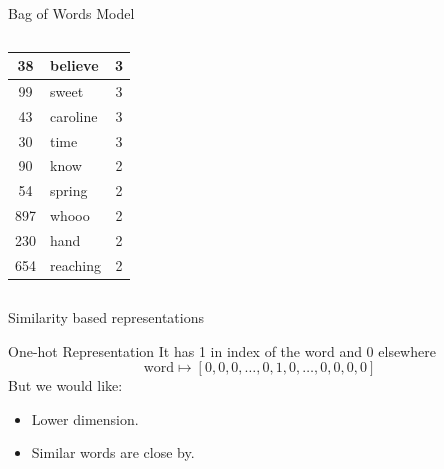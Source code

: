 \documentclass[9pt]{beamer}
\begin{document}
\begin{frame}{Bag of Words Model}
\begin{columns}[T]
\begin{column}{0.4\textwidth}
\begin{tabular}{|c|l|c|}
                \hline
                38 & believe&3\\
                \hline
                99 & sweet&3\\
                \hline
                43 & caroline&3\\
                \hline
                30 & time&3\\
                \hline
                90 &know&2\\
                \hline
                54& spring&2\\
                \hline
                897& whooo&2\\
                \hline
                230 & hand&2\\
                \hline
                654 & reaching&2\\
                \hline
            \end{tabular}
        \end{column}
    \end{columns}
\end{frame}


\begin{frame}{Similarity based representations}
    \begin{block}{One-hot Representation}
        It has 1 in index of the word and 0 elsewhere
        $$\text{word} \mapsto [0,0,0,\ldots,0,1,0,\ldots,0,0,0,0]$$
        But we would like:
        \begin{itemize}
            \item Lower dimension.
            \item Similar words are close by.
        \end{itemize}
    \end{block}



\end{frame}
\end{document}
